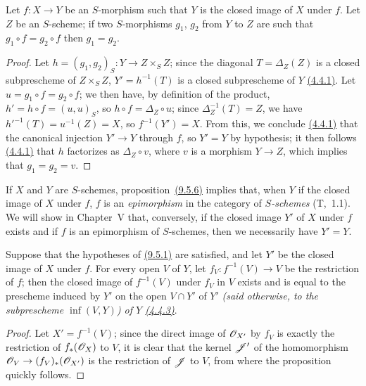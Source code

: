 \begin{cor}[9.5.6]
\label{cor-1.9.5.6}
Let $f:X\to Y$ be an $S$-morphism such that $Y$ is the closed image of $X$ under $f$.
Let $Z$ be an $S$-scheme; if two $S$-morphisms $g_1$, $g_2$ from $Y$ to $Z$ are such that $g_1\circ f=g_2\circ f$ then $g_1=g_2$.
\end{cor}

\begin{proof}
\label{proof-cor-1.9.5.6}
Let $h=(g_1,g_2)_S:Y\to Z\times_S Z$; since the diagonal $T=\Delta_Z(Z)$ is a closed subprescheme of $Z\times_S Z$, $Y'=h^{-1}(T)$ is a closed subprescheme of $Y$ \hyperref[prop-1.4.4.1]{(4.4.1)}.
Let $u=g_1\circ f=g_2\circ f$; we then have, by definition of the product, $h'=h\circ f=(u,u)_S$, so $h\circ f=\Delta_Z\circ u$; since $\Delta_Z^{-1}(T)=Z$, we have $h'^{-1}(T)=u^{-1}(Z)=X$, so $f^{-1}(Y')=X$.
From this, we conclude \hyperref[prop-1.4.4.1]{(4.4.1)} that the canonical injection $Y'\to Y$  through $f$, so $Y'=Y$ by hypothesis; it then follows \hyperref[prop-1.4.4.1]{(4.4.1)} that $h$ factorizes as $\Delta_Z\circ v$, where $v$ is a morphism $Y\to Z$, which implies that $g_1=g_2=v$.
\end{proof}

\begin{rmk}[9.5.7]
\label{rmk-1.9.5.7}
If $X$ and $Y$ are $S$-schemes, proposition~\hyperref[cor-1.9.5.6]{(9.5.6)} implies that, when $Y$ if the closed image of $X$ under $f$, $f$ is an {\em epimorphism} in the category of {\em $S$-schemes} (T,~1.1).
We will show in Chapter~V that, conversely, if the closed image $Y'$ of $X$ under $f$ exists and if $f$ is an epimorphism of $S$-schemes, then we necessarily have $Y'=Y$.
\end{rmk}

\begin{prop}[9.5.8]
\label{prop-1.9.5.8}
Suppose that the hypotheses of \hyperref[prop-1.9.5.1]{(9.5.1)} are satisfied, and let $Y'$ be the closed image of $X$ under $f$.
For every open $V$ of $Y$, let $f_V:f^{-1}(V)\to V$ be the restriction of $f$; then the closed image of $f^{-1}(V)$ under $f_V$ in $V$ exists and is equal to the prescheme induced by $Y'$ on the open $V\cap Y'$ of $Y'$ {\em (said otherwise, to the subprescheme $\inf(V,Y)$) of $Y$ \hyperref[cor-1.4.4.3]{(4.4.3)}}.
\end{prop}

\begin{proof}
\label{proof-prop-1.9.5.8}
Let $X'=f^{-1}(V)$; since the direct image of $\mathscr{O}_{X'}$ by $f_V$ is exactly the restriction of $f_*(\mathscr{O}_X)$ to $V$, it is clear that the kernel $\mathscr{J}'$ of the homomorphism $\mathscr{O}_V\to(f_V)_*(\mathscr{O}_{X'})$ is the restriction of $\mathscr{J}$ to $V$, from where the proposition quickly follows.
\end{proof}


